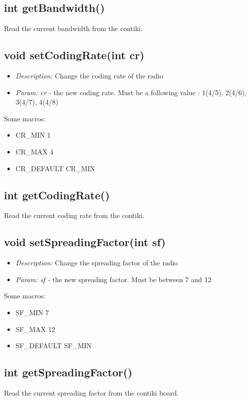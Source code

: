 \documentclass{article}
\begin{document}
\subsection{int getBandwidth()}
Read the current bandwidth from the contiki.

\subsection{void setCodingRate(int cr)}
\begin{itemize}
  \item \emph{Description:} Change the coding rate of the radio
  \item \emph{Param: cr -} the new coding rate. Must be a following value : 1(4/5), 2(4/6), 3(4/7), 4(4/8)
\end{itemize}
Some macros:
\begin{itemize}
  \item CR\_MIN     1
  \item CR\_MAX     4
  \item CR\_DEFAULT CR\_MIN
\end{itemize}

\subsection{int getCodingRate()}
Read the current coding rate from the contiki.

\subsection{void setSpreadingFactor(int sf)}
\begin{itemize}
  \item \emph{Description:} Change the spreading factor of the radio
  \item \emph{Param: sf -} the new spreading factor. Must be between 7 and 12
\end{itemize}
Some macros:
\begin{itemize}
  \item SF\_MIN     7
  \item SF\_MAX     12
  \item SF\_DEFAULT SF\_MIN
\end{itemize}

\subsection{int getSpreadingFactor()}
Read the current spreading factor from the contiki board.
\end{document}
